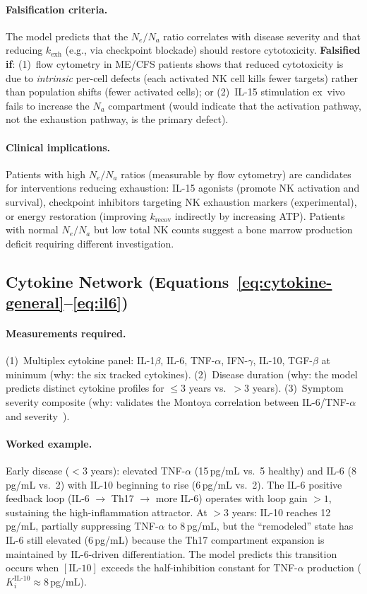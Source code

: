 \paragraph{Falsification criteria.}
The model predicts that the $N_e/N_a$ ratio correlates with disease severity and that reducing $k_{\text{exh}}$ (e.g., via checkpoint blockade) should restore cytotoxicity. \textbf{Falsified if}: (1)~flow cytometry in ME/CFS patients shows that reduced cytotoxicity is due to \emph{intrinsic} per-cell defects (each activated NK cell kills fewer targets) rather than population shifts (fewer activated cells); or (2)~IL-15 stimulation ex~vivo fails to increase the $N_a$ compartment (would indicate that the activation pathway, not the exhaustion pathway, is the primary defect).

\paragraph{Clinical implications.}
Patients with high $N_e/N_a$ ratios (measurable by flow cytometry) are candidates for interventions reducing exhaustion: IL-15 agonists (promote NK activation and survival), checkpoint inhibitors targeting NK exhaustion markers (experimental), or energy restoration (improving $k_{\text{recov}}$ indirectly by increasing ATP). Patients with normal $N_e/N_a$ but low total NK counts suggest a bone marrow production deficit requiring different investigation.

\subsection{Cytokine Network (Equations~\ref{eq:cytokine-general}--\ref{eq:il6})}

\paragraph{Measurements required.}
(1)~Multiplex cytokine panel: IL-1$\beta$, IL-6, TNF-$\alpha$, IFN-$\gamma$, IL-10, TGF-$\beta$ at minimum (why: the six tracked cytokines).
(2)~Disease duration (why: the model predicts distinct cytokine profiles for $\leq 3$ years vs.\ $> 3$ years).
(3)~Symptom severity composite (why: validates the Montoya correlation between IL-6/TNF-$\alpha$ and severity~\cite{Montoya2017}).

\paragraph{Worked example.}
Early disease ($< 3$ years): elevated TNF-$\alpha$ (15\,pg/mL vs.\ 5 healthy) and IL-6 (8\,pg/mL vs.\ 2) with IL-10 beginning to rise (6\,pg/mL vs.\ 2). The IL-6 positive feedback loop (IL-6 $\to$ Th17 $\to$ more IL-6) operates with loop gain $> 1$, sustaining the high-inflammation attractor. At $> 3$ years: IL-10 reaches 12\,pg/mL, partially suppressing TNF-$\alpha$ to 8\,pg/mL, but the ``remodeled'' state has IL-6 still elevated (6\,pg/mL) because the Th17 compartment expansion is maintained by IL-6-driven differentiation. The model predicts this transition occurs when $[\text{IL-10}]$ exceeds the half-inhibition constant for TNF-$\alpha$ production ($K_i^{\text{IL-10}} \approx 8$\,pg/mL).

